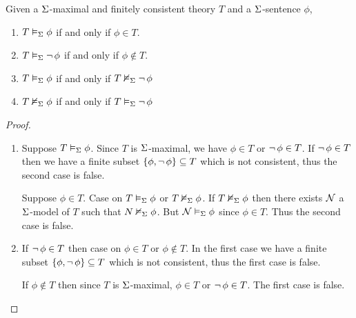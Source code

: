 \begin{prop}
    Given a $\Sigma$-maximal and finitely consistent theory $T$ and
    a $\Sigma$-sentence $\phi$, 
    \begin{enumerate}
        \item $T \vDash_{\Sigma} \phi$ if and only if $\phi \in T$.
        \item $T \vDash_{\Sigma} \neg\, \phi$ if and only if $\phi \notin T$.
        \item $T \vDash_{\Sigma} \phi$ if and only if $T \nvDash_{\Sigma} \neg\, \phi$
        \item $T \nvDash_{\Sigma} \phi$ if and only if $T \vDash_{\Sigma} \neg\, \phi$
    \end{enumerate}    
\end{prop}
\begin{proof}~
    \begin{enumerate}

        \item \begin{forward}
                Suppose $T \vDash_{\Sigma} \phi$.
                Since $T$ is $\Sigma$-maximal, 
                we have $\phi \in T$ or $\neg\, \phi \in T$.
                If $\neg\, \phi \in T$ then we have a finite subset 
                $\left\{\phi,\neg\, \phi\right\} \subseteq T$
                which is not consistent, 
                thus the second case is false.
            \end{forward}
        
            \begin{backward}
                Suppose $\phi \in T$. 
                Case on $T \vDash_{\Sigma} \phi$ or $T \nvDash_{\Sigma} \phi$.
                If $T \nvDash_{\Sigma} \phi$ then there exists 
                $\mathcal{N}$ a $\Sigma$-model of $T$ such that $N \nvDash_{\Sigma} \phi$.
                But $\mathcal{N} \vDash_{\Sigma} \phi$ since $\phi \in T$.
                Thus the second case is false.
            \end{backward}

        \item \begin{forward}
                If $\neg\, \phi \in T$ then case on 
                $\phi \in T$ or $\phi \notin T$.
                In the first case we have a finite subset 
                $\left\{\phi, \neg\, \phi\right\} \subseteq T$
                which is not consistent, 
                thus the first case is false.
            \end{forward}
        
            \begin{backward}
                If $\phi \notin T$ then since $T$ is $\Sigma$-maximal,
                $\phi \in T$ or $\neg\, \phi \in T$.
                The first case is false. 
            \end{backward}


\end{enumerate}
\end{proof}
